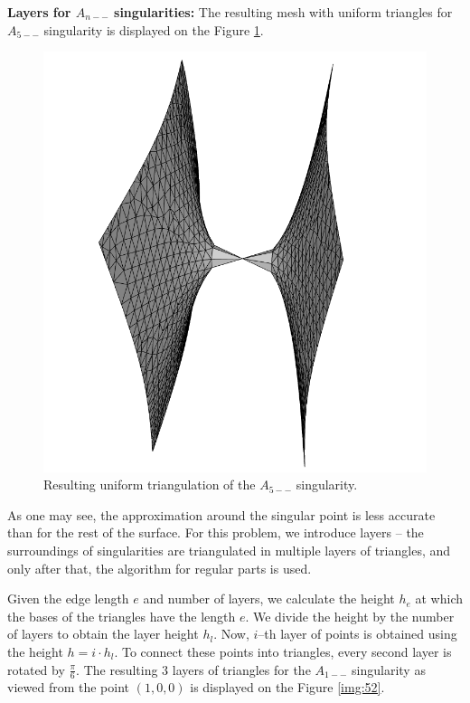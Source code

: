 \textbf{Layers for $A_{n--}$ singularities:}
The resulting mesh with uniform triangles for $A_{5--}$ singularity is displayed
on the Figure \ref{img:A5-uniform}.  

\begin{figure}
    \centerline{\includegraphics[scale=0.25]{images/A5-uniform}}
    \caption[Resulting uniform triangulation of the $A_{5--}$ singularity]
    {Resulting uniform triangulation of the $A_{5--}$ singularity.}
    \label{img:A5-uniform}
\end{figure}

As one may see, the approximation around the singular
point is less accurate than for the rest of the surface.
For this problem, we introduce layers -- the surroundings of singularities are
triangulated in multiple layers of triangles, and only after that, the algorithm for
regular parts is used.

Given the edge length $e$ and number of layers, we calculate the height $h_e$ 
at which the bases of the triangles
have the length $e$. We divide the height by the number of layers to obtain the
layer height $h_l$. Now, $i$--th layer of points is obtained using the height
$h = i\cdot h_l$. To connect these points into triangles, every second
layer is rotated by $\frac{\pi}{6}$. The resulting 3 layers of triangles
for the $A_{1--}$ singularity as viewed from the point $(1, 0, 0)$ is displayed on
the Figure \ref{img:52}. 

